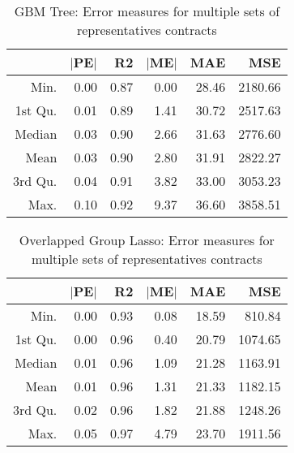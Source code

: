 \begin{table}[ht]
\centering
\begin{tabular}{rrrrrr}
\toprule
 & $|$PE$|$ & R2 & $|$ME$|$ & MAE & MSE \\
\midrule
  Min. & 0.00 & 0.87 & 0.00 & 28.46 & 2180.66 \\
  1st Qu. & 0.01 & 0.89 & 1.41 & 30.72 & 2517.63 \\
  Median & 0.03 & 0.90 & 2.66 & 31.63 & 2776.60 \\
  Mean & 0.03 & 0.90 & 2.80 & 31.91 & 2822.27 \\
  3rd Qu. & 0.04 & 0.91 & 3.82 & 33.00 & 3053.23 \\
  Max. & 0.10 & 0.92 & 9.37 & 36.60 & 3858.51 \\
\bottomrule
\end{tabular}
\caption{GBM Tree: Error measures for multiple sets of representatives contracts}
\label{gbm_erros}
\end{table}

\begin{table}[ht]
\centering
\begin{tabular}{rrrrrr}
\toprule
 & $|$PE$|$ & R2 & $|$ME$|$ & MAE & MSE \\
\midrule
  Min. & 0.00 & 0.93 & 0.08 & 18.59 & 810.84 \\
  1st Qu. & 0.00 & 0.96 & 0.40 & 20.79 & 1074.65 \\
  Median & 0.01 & 0.96 & 1.09 & 21.28 & 1163.91 \\
  Mean & 0.01 & 0.96 & 1.31 & 21.33 & 1182.15 \\
  3rd Qu. & 0.02 & 0.96 & 1.82 & 21.88 & 1248.26 \\
  Max. & 0.05 & 0.97 & 4.79 & 23.70 & 1911.56 \\
\bottomrule
\end{tabular}
\caption{Overlapped Group Lasso: Error measures for multiple sets of representatives contracts}
\label{lasso_erros}
\end{table}	

